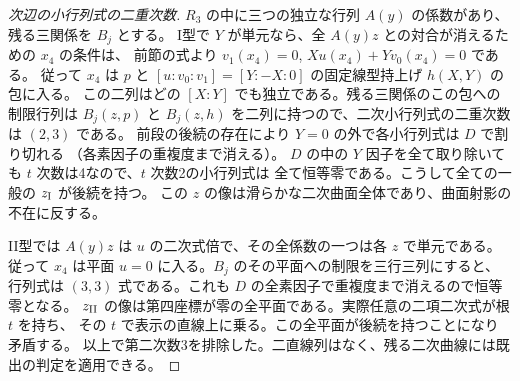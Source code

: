\begin{proof}[次辺の小行列式の二重次数]
$R_3$ の中に三つの独立な行列 $A(y)$ の係数があり、残る三関係を $B_j$ とする。
I型で $Y$ が単元なら、全 $A(y)z$ との対合が消えるための $x_4$ の条件は、
前節の式より $v_1(x_4)=0$, $Xu(x_4)+Yv_0(x_4)=0$ である。
従って $x_4$ は $p$ と $[u:v_0:v_1]=[Y:-X:0]$ の固定線型持上げ $h(X,Y)$ の包に入る。
この二列はどの $[X:Y]$ でも独立である。残る三関係のこの包への制限行列は
$B_j(z,p)$ と $B_j(z,h)$ を二列に持つので、二次小行列式の二重次数は $(2,3)$ である。
前段の後続の存在により $Y=0$ の外で各小行列式は $D$ で割り切れる
（各素因子の重複度まで消える）。
$D$ の中の $Y$ 因子を全て取り除いても $t$ 次数は4なので、$t$ 次数2の小行列式は
全て恒等零である。こうして全ての一般の $z_{\rm I}$ が後続を持つ。
この $z$ の像は滑らかな二次曲面全体であり、曲面射影の不在に反する。

II型では $A(y)z$ は $u$ の二次式倍で、その全係数の一つは各 $z$ で単元である。
従って $x_4$ は平面 $u=0$ に入る。$B_j$ のその平面への制限を三行三列にすると、
行列式は $(3,3)$ 式である。これも $D$ の全素因子で重複度まで消えるので恒等零となる。
$z_{\rm II}$ の像は第四座標が零の全平面である。実際任意の二項二次式が根 $t$ を持ち、
その $t$ で表示の直線上に乗る。この全平面が後続を持つことになり矛盾する。
以上で第二次数3を排除した。二直線列はなく、残る二次曲線には既出の判定を適用できる。
\end{proof}
